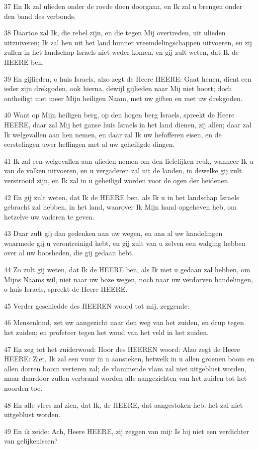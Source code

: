 \par 37 En Ik zal ulieden onder de roede doen doorgaan, en Ik zal u brengen onder den band des verbonds.
\par 38 Daartoe zal Ik, die rebel zijn, en die tegen Mij overtreden, uit ulieden uitzuiveren; Ik zal hen uit het land hunner vreemdelingschappen uitvoeren, en zij zullen in het landschap Israels niet weder komen, en gij zult weten, dat Ik de HEERE ben.
\par 39 En gijlieden, o huis Israels, alzo zegt de Heere HEERE: Gaat henen, dient een ieder zijn drekgoden, ook hierna, dewijl gijlieden naar Mij niet hoort; doch ontheiligt niet meer Mijn heiligen Naam, met uw giften en met uw drekgoden.
\par 40 Want op Mijn heiligen berg, op den hogen berg Israels, spreekt de Heere HEERE, daar zal Mij het ganse huis Israels in het land dienen, zij allen; daar zal Ik welgevallen aan hen nemen, en daar zal Ik uw hefofferen eisen, en de eerstelingen uwer heffingen met al uw geheiligde dingen.
\par 41 Ik zal een welgevallen aan ulieden nemen om den liefelijken reuk, wanneer Ik u van de volken uitvoeren, en u vergaderen zal uit de landen, in dewelke gij zult verstrooid zijn, en Ik zal in u geheiligd worden voor de ogen der heidenen.
\par 42 En gij zult weten, dat Ik de HEERE ben, als Ik u in het landschap Israels gebracht zal hebben, in het land, waarover Ik Mijn hand opgeheven heb, om hetzelve uw vaderen te geven.
\par 43 Daar zult gij dan gedenken aan uw wegen, en aan al uw handelingen waarmede gij u verontreinigd hebt, en gij zult van u zelven een walging hebben over al uw boosheden, die gij gedaan hebt.
\par 44 Zo zult gij weten, dat Ik de HEERE ben, als Ik met u gedaan zal hebben, om Mijns Naams wil, niet naar uw boze wegen, noch naar uw verdorven handelingen, o huis Israels, spreekt de Heere HEERE.
\par 45 Verder geschiedde des HEEREN woord tot mij, zeggende:
\par 46 Mensenkind, zet uw aangezicht naar den weg van het zuiden, en drup tegen het zuiden; en profeteer tegen het woud van het veld in het zuiden.
\par 47 En zeg tot het zuiderwoud: Hoor des HEEREN woord: Alzo zegt de Heere HEERE: Ziet, Ik zal een vuur in u aansteken, hetwelk in u allen groenen boom en allen dorren boom verteren zal; de vlammende vlam zal niet uitgeblust worden, maar daardoor zullen verbrand worden alle aangezichten van het zuiden tot het noorden toe.
\par 48 En alle vlees zal zien, dat Ik, de HEERE, dat aangestoken heb; het zal niet uitgeblust worden.
\par 49 En ik zeide: Ach, Heere HEERE, zij zeggen van mij: Is hij niet een verdichter van gelijkenissen?

